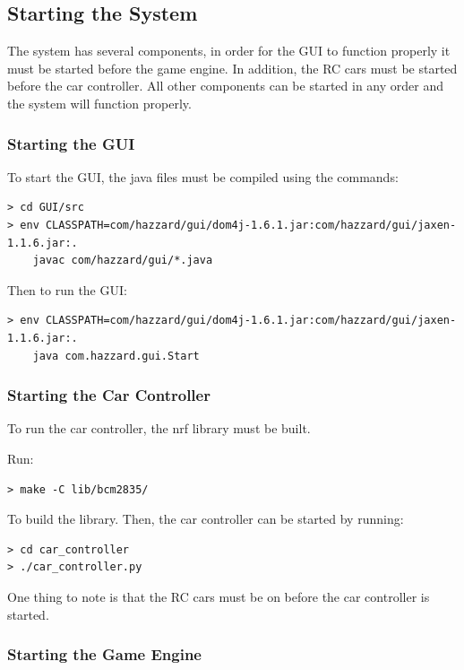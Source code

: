 \documentclass[letterpaper,fleqn]{article}
\begin{document}
\subsection{Starting the System}
The system has several components, in order for the GUI to function properly
it must be started before the game engine. In addition, the RC cars must be started
before the car controller. All other components can be started in any order and the
system will function properly.

\subsubsection{Starting the GUI}

To start the GUI, the java files must be compiled using the commands:

\begin{lstlisting}
> cd GUI/src
> env CLASSPATH=com/hazzard/gui/dom4j-1.6.1.jar:com/hazzard/gui/jaxen-1.1.6.jar:.
	javac com/hazzard/gui/*.java
\end{lstlisting}

Then to run the GUI:

\begin{lstlisting}
> env CLASSPATH=com/hazzard/gui/dom4j-1.6.1.jar:com/hazzard/gui/jaxen-1.1.6.jar:.
	java com.hazzard.gui.Start
\end{lstlisting}

\subsubsection{Starting the Car Controller}

To run the car controller, the nrf library must be built.

Run:

\begin{lstlisting}
> make -C lib/bcm2835/
\end{lstlisting}

To build the library. Then, the car controller can be started by running:

\begin{lstlisting}
> cd car_controller
> ./car_controller.py
\end{lstlisting}

One thing to note is that the RC cars must be on before the car controller is started.

\subsubsection{Starting the Game Engine}
\end{document}
